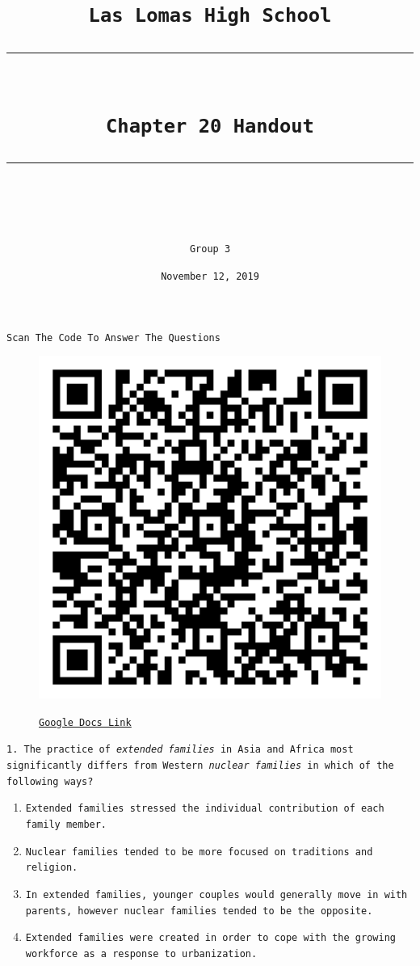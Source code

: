 \documentclass[11pt]{scrartcl} %
\title{	
	\normalfont\normalsize
	\texttt{Las Lomas High School}\\ %
	\vspace{25pt} %
	\rule{\linewidth}{0.5pt}\\ %
	\vspace{20pt} %
	{\huge \texttt{Chapter 20 Handout}}\\ %
	\vspace{12pt} %
	\rule{\linewidth}{2pt}\\ %
	\vspace{12pt} %
}
\author{\texttt{Group 3}} %
\date{\normalsize \texttt{November 12, 2019}} %
\begin{document}
\maketitle %


\begin{center} \Large \texttt{Scan The Code To Answer The Questions}\end{center}

\begin{figure}[h] %
	\centering
	\includegraphics[width=0.25\columnwidth]{qr-code.png} %
	\begin{center}\href{https://docs.google.com/forms/d/e/1FAIpQLSc794dqVmLl6f5EkGEPvQupIA8nWMs-8h1mz9iuT837Zu6yVw/viewform?usp=sf_link}{\underline{\texttt{Google Docs Link}}}\end{center}
\end{figure}



\texttt{1. The practice of \textit{extended families} in Asia and Africa most significantly differs from Western \textit{nuclear families} in which of the following ways?}

\begin{enumerate}[label=\texttt{\textbf{\alph*)}}]
\item \texttt{Extended families stressed the individual contribution of each family member.}
\item \texttt{Nuclear families tended to be more focused on traditions and religion.}
\item \texttt{In extended families, younger couples would generally move in with parents, however nuclear families tended to be the opposite.}
\item \texttt{Extended families were created in order to cope with the growing workforce as a response to urbanization.}
\end{enumerate}
\end{document}
